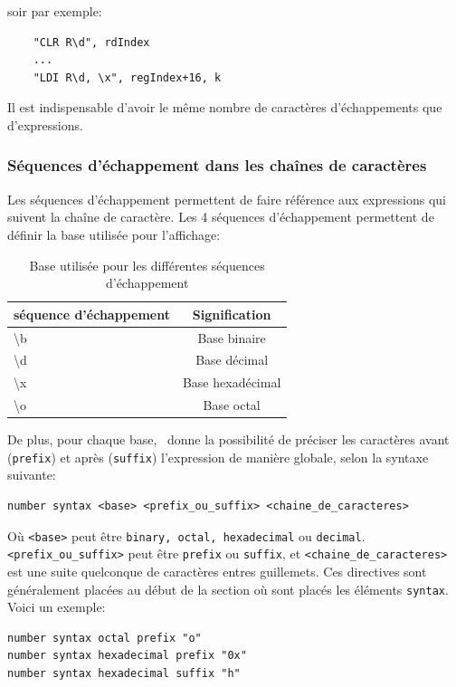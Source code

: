 soir par exemple:
\begin{lstlisting}
    "CLR R\d", rdIndex
    ...
    "LDI R\d, \x", regIndex+16, k
\end{lstlisting}
Il est indispensable d'avoir le même nombre de caractères d'échappements que d'expressions.

\subsubsection{Séquences d'échappement dans les chaînes de caractères}
Les séquences d'échappement permettent de faire référence aux expressions qui suivent la chaîne de caractère. Les 4 séquences d'échappement permettent de définir la base utilisée pour l'affichage:
\begin{table}[!h]
\begin{center}
\begin{tabularx}{0.7 \columnwidth}{|X|c|}
\hline
\bf séquence d'échappement & \bf Signification \\  \hline
\textbackslash b & Base binaire \\ \hline
\textbackslash d & Base décimal \\ \hline
\textbackslash x & Base hexadécimal \\ \hline
\textbackslash o & Base octal \\ \hline
\end{tabularx}
\caption{Base utilisée pour les différentes séquences d'échappement}
\label{tab:type-donnee}
\end{center}
\end{table}

De plus, pour chaque base, \harmless\ donne la possibilité de préciser les caractères avant (\texttt{prefix}) et après (\texttt{suffix}) l'expression de manière globale, selon la syntaxe suivante: 

\begin{lstlisting}
number syntax <base> <prefix_ou_suffix> <chaine_de_caracteres>
\end{lstlisting}

Où {\tt <base>} peut être {\tt binary, octal, hexadecimal} ou {\tt decimal}. {\tt <prefix\_ou\_suffix>} peut être {\tt prefix} ou {\tt suffix}, et \texttt{<chaine\_de\_caracteres>} est une suite quelconque de caractères entres guillemets. Ces directives sont généralement placées au début de la section où sont placés les éléments \texttt{syntax}.
Voici un exemple: 

\begin{lstlisting}
number syntax octal prefix "o"
number syntax hexadecimal prefix "0x"
number syntax hexadecimal suffix "h"
\end{lstlisting}

